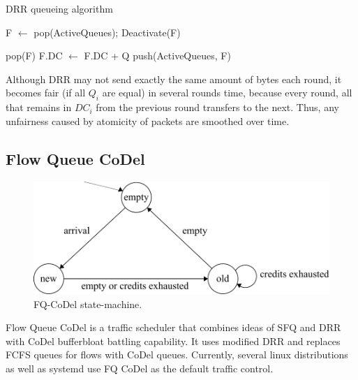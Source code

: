 \begin{algorithm}[t]
	\caption{DRR queueing algorithm}
	\label{alg01:DRR_deq}
	\begin{algorithmic}
		\State \Return {}
	\EndFunction
			\State F $\leftarrow$ pop(ActiveQueues);
				\State Deactivate(F)
				
					\State \Return pop(F)
			\Else {}
				\State F.DC $\leftarrow$ F.DC + Q
				\State push(ActiveQueues, F)
			\EndIf
		\EndWhile
	\EndFunction
	\end{algorithmic}
\end{algorithm}

Although DRR may not send exactly the same amount of bytes each round, it becomes fair (if all $Q_i$ are equal) in several rounds time, because every round, all that remains in $DC_i$ from the previous round transfers to the next. Thus, any unfairness caused by atomicity of packets are smoothed over time.


\subsection{Flow Queue CoDel}

\begin{figure}
	\centering
	\includegraphics[width=137mm]{drawings/fq_codel}
	\caption{FQ-CoDel state-machine. }
	\label{fig06:fqcodel}
\end{figure}

Flow Queue CoDel \cite{fq_codel} is a traffic scheduler that combines ideas of SFQ and DRR with CoDel bufferbloat battling capability. It uses modified DRR and replaces FCFS queues for flows with CoDel queues. Currently, several linux distributions as well as systemd use FQ CoDel as the default traffic control.

